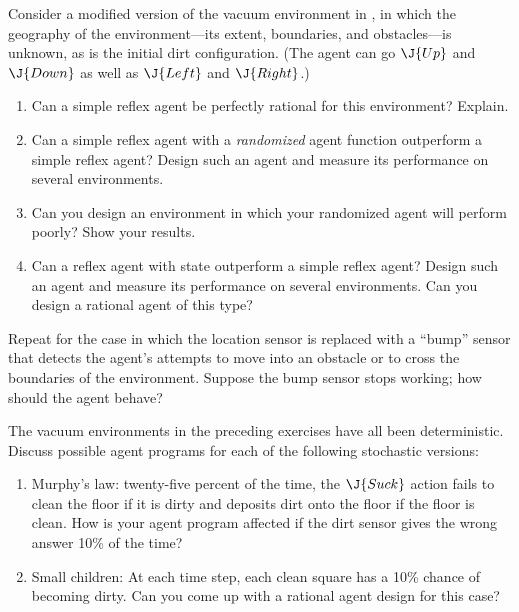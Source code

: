 \begin{exercise}%
Consider a modified version of the vacuum environment in
, in which the geography of the
environment---its extent, boundaries, and obstacles---is unknown, as
is the initial dirt configuration. (The agent can go \(\J{Up}\) and
\(\J{Down}\) as well as \(\J{Left}\) and \(\J{Right}\).)
\begin{enumerate}
\item Can a simple reflex agent be perfectly rational
for this environment? Explain.
\item Can a simple reflex agent with a {\em randomized} agent function
outperform a simple reflex agent? Design such an agent
and measure its performance on several environments.
\item Can you design an environment in which your randomized agent will perform
poorly? Show your results.
\item Can a reflex agent with state outperform a simple
reflex agent? Design such an agent
and measure its performance on several environments.
Can you design a rational agent of this type?
\end{enumerate}
\end{exercise} 

\begin{exercise}
Repeat  for the case
in which the location sensor is replaced with a ``bump'' sensor
that detects the agent's attempts to move into an obstacle or to cross
the boundaries of the environment. Suppose the bump sensor stops
working; how should the agent behave?
\end{exercise} 

\begin{exercise}%
The vacuum environments in the preceding exercises have all been
deterministic. Discuss possible agent programs for each of the
following stochastic versions:
\begin{enumerate}
\item Murphy's law: twenty-five percent of the time, the \(\J{Suck}\) action 
fails to clean the floor if it is dirty and deposits
dirt onto the floor if the floor is clean. How is your agent program
affected if the dirt sensor gives the wrong answer 10\% of the time?
\item Small children: At each time step,
each clean square has a 10\% chance of becoming dirty.
Can you come up with a rational agent design for this case?
\end{enumerate}
\end{exercise} 



















